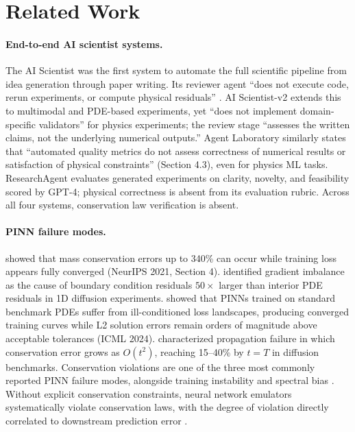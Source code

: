 \documentclass{article}
\begin{document}
\section{Related Work}

\paragraph{End-to-end AI scientist systems.}
The AI Scientist \citep{Lu2024AIScientist} was the first system to automate
the full scientific pipeline from idea generation through paper writing.
Its reviewer agent ``does not execute code, rerun experiments, or compute
physical residuals'' \citep{Lu2024AIScientist}.
AI Scientist-v2 \citep{Lu2025AIScientistV2} extends this to multimodal and
PDE-based experiments, yet ``does not implement domain-specific validators''
for physics experiments; the review stage ``assesses the written claims, not
the underlying numerical outputs.''
Agent Laboratory \citep{Wang2024AgentLab} similarly states that ``automated
quality metrics do not assess correctness of numerical results or satisfaction
of physical constraints'' (Section 4.3), even for physics ML tasks.
ResearchAgent \citep{Baek2024ResearchAgent} evaluates generated experiments
on clarity, novelty, and feasibility scored by GPT-4; physical correctness is
absent from its evaluation rubric.
Across all four systems, conservation law verification is absent.

\paragraph{PINN failure modes.}
\citet{Krishnapriyan2021Failures} showed that mass conservation errors up to
340\% can occur while training loss appears fully converged (NeurIPS 2021,
Section 4).
\citet{Wang2022WhenPINNsFail} identified gradient imbalance as the cause of
boundary condition residuals $50\times$ larger than interior PDE residuals in
1D diffusion experiments.
\citet{Rathore2024Challenges} showed that PINNs trained on standard benchmark
PDEs suffer from ill-conditioned loss landscapes, producing converged training
curves while L2 solution errors remain orders of magnitude above acceptable
tolerances (ICML 2024).
\citet{Daw2022MitigatingPropagation} characterized propagation failure in
which conservation error grows as $O(t^2)$, reaching 15--40\% by $t=T$ in
diffusion benchmarks.
Conservation violations are one of the three most commonly reported PINN
failure modes, alongside training instability and spectral bias
\citep{Cuomo2022ScientificML}.
Without explicit conservation constraints, neural network emulators
systematically violate conservation laws, with the degree of violation
directly correlated to downstream prediction error \citep{Beucler2021Enforcing}.
\end{document}
